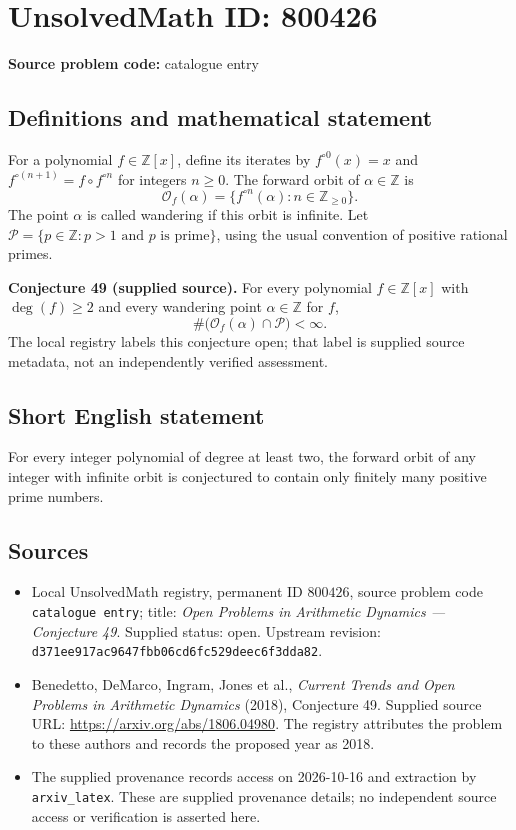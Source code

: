 \documentclass[11pt]{article}
\newcommand{\Z}{\mathbb{Z}}
\begin{document}
\section*{UnsolvedMath ID: 800426}
\textbf{Source problem code:} catalogue entry
\subsection{Definitions and mathematical statement}
For a polynomial \(f\in\Z[x]\), define its iterates by \(f^{\circ 0}(x)=x\) and \(f^{\circ(n+1)}=f\circ f^{\circ n}\) for integers \(n\geq 0\). The forward orbit of \(\alpha\in\Z\) is
\[
\mathcal O_f(\alpha)=\{f^{\circ n}(\alpha):n\in\Z_{\geq 0}\}.
\]
The point \(\alpha\) is called wandering if this orbit is infinite. Let \(\mathcal P=\{p\in\Z:p>1\text{ and }p\text{ is prime}\}\), using the usual convention of positive rational primes.

\textbf{Conjecture 49 (supplied source).} For every polynomial \(f\in\Z[x]\) with \(\deg(f)\geq 2\) and every wandering point \(\alpha\in\Z\) for \(f\),
\[
\#\bigl(\mathcal O_f(\alpha)\cap\mathcal P\bigr)<\infty.
\]
The local registry labels this conjecture open; that label is supplied source metadata, not an independently verified assessment.
\subsection{Short English statement}
For every integer polynomial of degree at least two, the forward orbit of any integer with infinite orbit is conjectured to contain only finitely many positive prime numbers.
\subsection{Sources}
\begin{itemize}
\item Local UnsolvedMath registry, permanent ID \(800426\), source problem code \texttt{catalogue entry}; title: \emph{Open Problems in Arithmetic Dynamics --- Conjecture 49}. Supplied status: open. Upstream revision: \texttt{d371ee917ac9647fbb06cd6fc529deec6f3dda82}.
\item Benedetto, DeMarco, Ingram, Jones et al., \emph{Current Trends and Open Problems in Arithmetic Dynamics} (2018), Conjecture 49. Supplied source URL: \url{https://arxiv.org/abs/1806.04980}. The registry attributes the problem to these authors and records the proposed year as 2018.
\item The supplied provenance records access on 2026-10-16 and extraction by \texttt{arxiv\_latex}. These are supplied provenance details; no independent source access or verification is asserted here.
\end{itemize}
\end{document}
